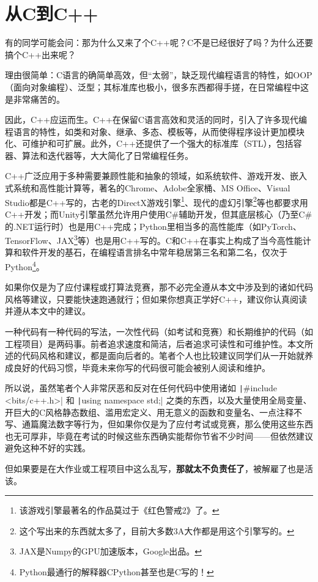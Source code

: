 \chapter{从C到C++}\label{chap:cpp-1}

有的同学可能会问：那为什么又来了个C++呢？C不是已经很好了吗？为什么还要搞个C++出来呢？

理由很简单：C语言的确简单高效，但“太弱”，缺乏现代编程语言的特性，如OOP（面向对象编程）、泛型；其标准库也极小，很多东西都得手搓，在日常编程中这是非常痛苦的。

因此，C++应运而生。C++在保留C语言高效和灵活的同时，引入了许多现代编程语言的特性，如类和对象、继承、多态、模板等，从而使得程序设计更加模块化、可维护和可扩展。此外，C++还提供了一个强大的标准库（STL），包括容器、算法和迭代器等，大大简化了日常编程任务。

C++广泛应用于多种需要兼顾性能和抽象的领域，如系统软件、游戏开发、嵌入式系统和高性能计算等，著名的Chrome、Adobe全家桶、MS Office、Visual Studio都是C++写的，古老的DirectX游戏引擎\footnote{该游戏引擎最著名的作品莫过于《红色警戒2》了。}、现代的虚幻引擎\footnote{这个写出来的东西就太多了，目前大多数3A大作都是用这个引擎写的。}等也都要求用C++开发；而Unity引擎虽然允许用户使用C\#辅助开发，但其底层核心（乃至C\#的.NET运行时）也是用C++完成；Python里相当多的高性能库（如PyTorch、TensorFlow、JAX\footnote{JAX是Numpy的GPU加速版本，Google出品。}等）也是用C++写的。C和C++在事实上构成了当今高性能计算和软件开发的基石，在编程语言排名中常年稳居第三名和第二名，仅次于Python\footnote{Python最通行的解释器CPython甚至也是C写的！}。

\begin{caution}
    如果你仅是为了应付课程或打算法竞赛，那不必完全遵从本文中涉及到的诸如代码风格等建议，只要能快速跑通就行；但如果你想真正学好C++，建议你认真阅读并遵从本文中的建议。

    一种代码有一种代码的写法，一次性代码（如考试和竞赛）和长期维护的代码（如工程项目）是两码事。前者追求速度和简洁，后者追求可读性和可维护性。本文所述的代码风格和建议，都是面向后者的。笔者个人也比较建议同学们从一开始就养成良好的代码习惯，毕竟未来你写的代码很可能会被别人阅读和维护。

    所以说，虽然笔者个人非常厌恶和反对在任何代码中使用诸如 \texttt|#include <bits/c++.h>| 和 \texttt|using namespace std;| 之类的东西，以及大量使用全局变量、开巨大的C风格静态数组、滥用宏定义、用无意义的函数和变量名、一点注释不写、通篇魔法数字等行为，但如果你仅是为了应付考试或竞赛，那么使用这些东西也无可厚非，毕竟在考试的时候这些东西确实能帮你节省不少时间——但依然建议避免这种不好的实践。
    
    但如果要是在大作业或工程项目中这么乱写，\textbf{那就太不负责任了}，被解雇了也是活该。
\end{caution}


